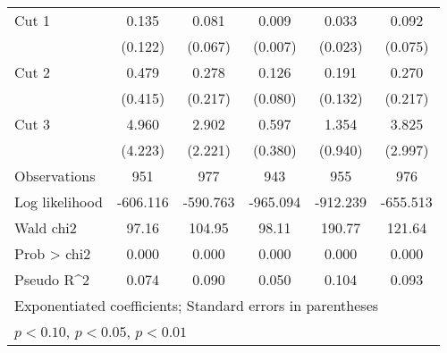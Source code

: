 \begin{table}[htbp]
\begin{tabular}{l*{5}{c}}
Cut 1               &       0.135\sym{**} &       0.081\sym{***}&       0.009\sym{***}&       0.033\sym{***}&       0.092\sym{***}\\
                    &     (0.122)         &     (0.067)         &     (0.007)         &     (0.023)         &     (0.075)         \\
Cut 2               &       0.479         &       0.278         &       0.126\sym{***}&       0.191\sym{**} &       0.270         \\
                    &     (0.415)         &     (0.217)         &     (0.080)         &     (0.132)         &     (0.217)         \\
Cut 3               &       4.960\sym{*}  &       2.902         &       0.597         &       1.354         &       3.825\sym{*}  \\
                    &     (4.223)         &     (2.221)         &     (0.380)         &     (0.940)         &     (2.997)         \\
\hline
Observations        &         951         &         977         &         943         &         955         &         976         \\
Log likelihood      &    -606.116         &    -590.763         &    -965.094         &    -912.239         &    -655.513         \\
Wald chi2           &       97.16         &      104.95         &       98.11         &      190.77         &      121.64         \\
Prob > chi2         &       0.000         &       0.000         &       0.000         &       0.000         &       0.000         \\
Pseudo R^2          &       0.074         &       0.090         &       0.050         &       0.104         &       0.093         \\
\hline\hline
\multicolumn{6}{l}{\footnotesize Exponentiated coefficients; Standard errors in parentheses}\\
\multicolumn{6}{l}{\footnotesize \sym{*} \(p<0.10\), \sym{**} \(p<0.05\), \sym{***} \(p<0.01\)}\\
\end{tabular}
\end{table}

